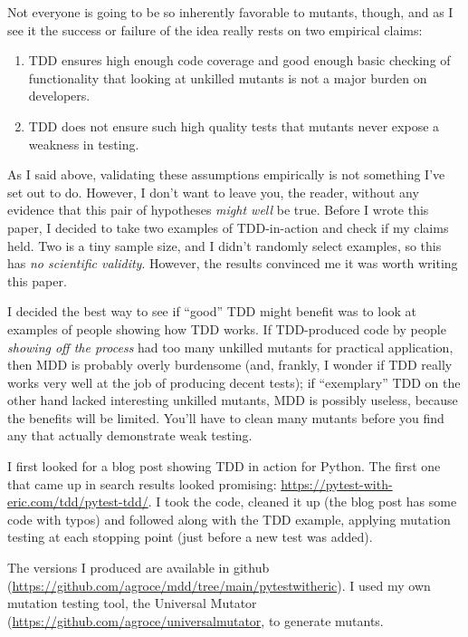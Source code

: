 \documentclass[sigplan,screen]{acmart}
\begin{document}
Not everyone is going to be so inherently favorable to mutants,
though, and as I see it the success or failure of the idea really
rests on two empirical claims:

\begin{enumerate}
  \item TDD ensures high enough code coverage and good enough basic
    checking of functionality that looking at unkilled mutants is not
    a major burden on developers.
    \item TDD does not ensure such high quality tests that mutants
      never expose a weakness in testing.
    \end{enumerate}

    As I said above, validating these assumptions empirically is not
    something I've set out to do.  However, I don't want to leave you,
    the reader, without any evidence that this pair of hypotheses
    \emph{might well} be true.  Before I wrote this paper, I decided
    to take two examples of TDD-in-action and check if my claims
    held.  Two is a tiny sample size, and I didn't randomly select
    examples, so this has \emph{no scientific validity}.  However, the
    results convinced me it was worth writing this paper.

    I decided the best way to see if ``good'' TDD might benefit was to
    look at examples of people showing how TDD works.  If TDD-produced
    code by people \emph{showing off the process} had too many
    unkilled mutants for practical application, then MDD is probably
    overly burdensome (and, frankly, I wonder if TDD really works very
    well at the job of producing decent tests); if ``exemplary'' TDD
    on the other hand lacked interesting unkilled mutants, MDD is
    possibly useless, because the benefits will be limited.  You'll
    have to clean many mutants before you find any that actually
    demonstrate weak testing.

    I first looked for a blog post showing TDD in action for Python.
    The first one that came up in search results looked promising:
    \url{https://pytest-with-eric.com/tdd/pytest-tdd/}.  I took the
    code, cleaned it up (the blog post has some code with typos) and
    followed along with the TDD example, applying mutation testing at
    each stopping point (just before a new test was added).

    The versions I produced are available in github
    (\url{https://github.com/agroce/mdd/tree/main/pytestwitheric}).  I
    used my own mutation testing tool, the Universal
    Mutator~\cite{SyntaxUM}
    (\url{https://github.com/agroce/universalmutator}, to generate
    mutants.
\end{document}
